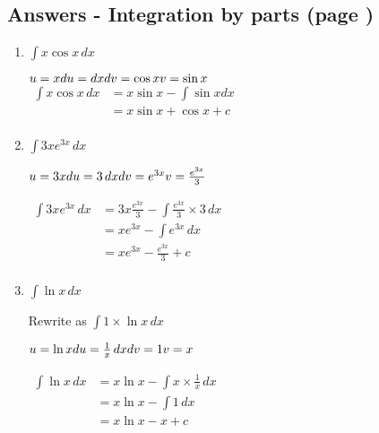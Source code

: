 \documentclass[../main.tex]{subfiles}
\begin{document}
\subsection*{Answers - Integration by parts (page \pageref{Integration by parts})}
\label{Integration by parts answers}

\begin{enumerate}
    \item \(\int x\cos{x} \, dx\)
    
    \(u=x\\
    du=dx\\
    dv=\cos{x}\\
    v=\sin{x}\)\\
    $
    \!
    \begin{aligned}
        \int x\cos{x} \, dx 
        &= x\sin{x}-\int \sin{x} dx\\
        &=x\sin{x}+\cos{x}+c\\
    \end{aligned}
    $

    \item \(\int 3xe^{3x}\, dx\)
    
    \(u=3x\\
    du=3\,dx\\
    dv=e^{3x}\\
    v=\frac{e^{3x}}{3}\)

    $
    \!
    \begin{aligned}
        \int 3xe^{3x}\, dx 
        &=3x\frac{e^{3x}}{3}-\int \frac{e^{3x}}{3}\times 3 \,dx\\
        &=xe^{3x}-\int e^{3x}\, dx\\
        &=xe^{3x}-\frac{e^{3x}}{3}+c\\
    \end{aligned}
    $

    \item \(\int \ln{x}\, dx\)
    
    Rewrite as \(\int 1\times \ln{x}\, dx\)

    \(u=\ln{x}\\
    du=\frac{1}{x}\,dx\\
    dv=1\\
    v=x\)

    $
    \!
    \begin{aligned}
        \int \ln{x}\, dx
        &=x\ln{x}-\int x\times \frac{1}{x}\, dx\\
        &=x\ln{x}-\int 1\, dx\\
        &=x\ln{x}-x+c\\
    \end{aligned}
    $


\end{enumerate}
\end{document}
